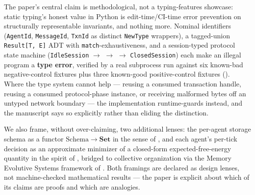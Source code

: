 \documentclass[
  english,
]{article}
\theoremstyle{definition}
\begin{document}
The paper's central claim is methodological, not a typing-features
showcase: static typing's honest value in Python is edit-time/CI-time
error prevention on structurally representable invariants, and nothing
more. Nominal identifiers (\texttt{AgentId}, \texttt{MessageId},
\texttt{TxnId} as distinct \texttt{NewType} wrappers), a tagged-union
\texttt{Result{[}T,\ E{]}} ADT with \texttt{match}-exhaustiveness, and a
session-typed protocol state machine (\texttt{IdleSession} \texorpdfstring{\ensuremath{\to}}{->}
 \texorpdfstring{\ensuremath{\to}}{->}  \texorpdfstring{\ensuremath{\to}}{->}
\texttt{ClosedSession}) each make an illegal program a \textbf{type
error}, verified by a real  subprocess run
against six known-bad negative-control fixtures plus three known-good
positive-control fixtures (). Where the
type system cannot help --- reusing a consumed transaction handle,
reusing a consumed protocol-phase instance, or receiving malformed bytes
off an untyped network boundary --- the implementation runtime-guards
instead, and the manuscript says so explicitly rather than eliding the
distinction.

We also frame, without over-claiming, two additional lenses: the
per-agent storage schema as a functor
\(\mathrm{Schema} \to \mathbf{Set}\) in the sense of
\citet{fong2018seven}, and each agent's per-tick decision as an
approximate minimizer of a closed-form expected-free-energy quantity in
the spirit of \citet{friston2005theory}, bridged to collective
organization via the Memory Evolutive Systems framework of
\citep{ehresmann2007memory}. Both framings are declared as design
lenses, not machine-checked mathematical results --- the paper is
explicit about which of its claims are proofs and which are analogies.
\end{document}
